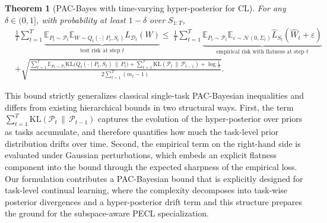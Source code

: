 \documentclass[10pt]{article} %
\newtheorem{theorem}{Theorem}
\begin{document}

\begin{theorem}[PAC-Bayes with time-varying hyper-posterior for CL]\label{thm:pathwise-pacbayes}
For any $\delta\in(0,1]$, with probability at least $1-\delta$ over $S_{1:T}$,
\begin{equation}\label{eq:main-bound}
\begin{aligned} 
& \frac{1}{T} \sum_{t=1}^T \underbrace{\mathbb{E}_{P_t \sim \mathcal{P}_t} \mathbb{E}_{W \sim Q_t(\cdot \mid P_t, S_t)} L_{\mathcal{D}_t}(W)}_{\text{test risk at step } t} 
\le \ \frac{1}{T} \sum_{t=1}^T \underbrace{\mathbb{E}_{P_t \sim \mathcal{P}_t} \mathbb E_{\varepsilon\sim\mathcal N(0,\Sigma_t)}\hat L_{S_t}(\hat W_t+\varepsilon)}_{\text{empirical risk with flatness at step } t} \\ 
& + \sqrt{\frac{ \sum_{t=1}^T \mathbb{E}_{P_t \sim \mathcal{P}_t} \mathrm{KL}\big(Q_t(\cdot \mid P_t, S_t) \,\|\, P_t\big) + \sum_{t=1}^T \mathrm{KL}(\mathcal{P}_t \,\|\, \mathcal{P}_{t-1}) + \log\frac{1}{\delta} }{2 \sum_{t=1}^T (m_t - 1)}}. 
\end{aligned} 
\end{equation}
\end{theorem}

This bound strictly generalizes classical single-task PAC-Bayesian inequalities and differs from existing hierarchical bounds in two structural ways.
First, the term $\sum_{t=1}^T \mathrm{KL}(\mathcal{P}_t \,\|\, \mathcal{P}_{t-1})$ captures the evolution of the hyper-posterior over priors as tasks accumulate, and therefore quantifies how much the task-level prior distribution drifts over time. Second, the empirical term on the right-hand side is evaluated under Gaussian perturbations, which embeds an explicit flatness component into the bound through the expected sharpness of the empirical loss.
Our formulation contributes a PAC-Bayesian bound that is explicitly designed for task-level continual learning, where the complexity decomposes into task-wise posterior divergences and a hyper-posterior drift term and this structure prepares the ground for the subspace-aware PECL specialization.
\end{document}
